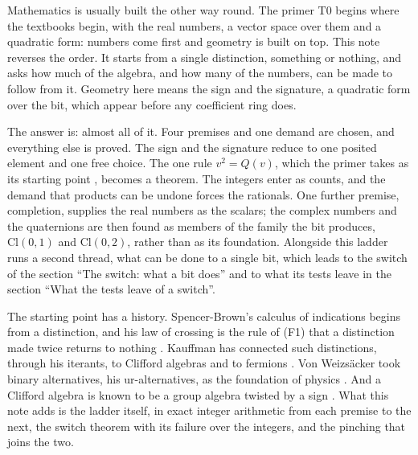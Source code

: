 \documentclass[11pt]{article}
\theoremstyle{definition}
\theoremstyle{plain}
\providecommand{\Cl}{}\renewcommand{\Cl}{\mathrm{Cl}}
\begin{document}
Mathematics is usually built the other way round. The primer T0 \cite{ButlerT0} begins where the textbooks begin, with the real numbers, a vector space over them and a quadratic form: numbers come first and geometry is built on top. This note reverses the order. It starts from a single distinction, something or nothing, and asks how much of the algebra, and how many of the numbers, can be made to follow from it. Geometry here means the sign and the signature, a quadratic form over the bit, which appear before any coefficient ring does.

The answer is: almost all of it. Four premises and one demand are chosen, and everything else is proved. The sign and the signature reduce to one posited element and one free choice. The one rule $v^{2} = Q(v)$, which the primer takes as its starting point \cite[Section 2]{ButlerT0}, becomes a theorem. The integers enter as counts, and the demand that products can be undone forces the rationals. One further premise, completion, supplies the real numbers as the scalars; the complex numbers and the quaternions are then found as members of the family the bit produces, $\Cl(0,1)$ and $\Cl(0,2)$, rather than as its foundation. Alongside this ladder runs a second thread, what can be done to a single bit, which leads to the switch of the section ``The switch: what a bit does'' and to what its tests leave in the section ``What the tests leave of a switch''.

The starting point has a history. Spencer-Brown's calculus of indications begins from a distinction, and his law of crossing is the rule of (F1) that a distinction made twice returns to nothing \cite{SpencerBrown1969}. Kauffman has connected such distinctions, through his iterants, to Clifford algebras and to fermions \cite{Kauffman2021}. Von Weizs\"acker took binary alternatives, his ur-alternatives, as the foundation of physics \cite{Weizsacker1985}. And a Clifford algebra is known to be a group algebra twisted by a sign \cite{AlbuquerqueMajid2002}. What this note adds is the ladder itself, in exact integer arithmetic from each premise to the next, the switch theorem with its failure over the integers, and the pinching that joins the two.
\end{document}

